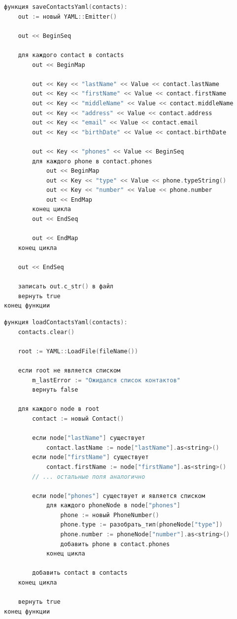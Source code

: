 \begin{lstlisting}[language=C, caption=Функция saveContactsYaml]
функция saveContactsYaml(contacts):
    out := новый YAML::Emitter()
    
    out << BeginSeq
    
    для каждого contact в contacts
        out << BeginMap
        
        out << Key << "lastName" << Value << contact.lastName
        out << Key << "firstName" << Value << contact.firstName
        out << Key << "middleName" << Value << contact.middleName
        out << Key << "address" << Value << contact.address
        out << Key << "email" << Value << contact.email
        out << Key << "birthDate" << Value << contact.birthDate
        
        out << Key << "phones" << Value << BeginSeq
        для каждого phone в contact.phones
            out << BeginMap
            out << Key << "type" << Value << phone.typeString()
            out << Key << "number" << Value << phone.number
            out << EndMap
        конец цикла
        out << EndSeq
        
        out << EndMap
    конец цикла
    
    out << EndSeq
    
    записать out.c_str() в файл
    вернуть true
конец функции
\end{lstlisting}

\begin{lstlisting}[language=C, caption=Функция loadContactsYaml]
функция loadContactsYaml(contacts):
    contacts.clear()
    
    root := YAML::LoadFile(fileName())
    
    если root не является списком
        m_lastError := "Ожидался список контактов"
        вернуть false
    
    для каждого node в root
        contact := новый Contact()
        
        если node["lastName"] существует
            contact.lastName := node["lastName"].as<string>()
        если node["firstName"] существует
            contact.firstName := node["firstName"].as<string>()
        // ... остальные поля аналогично
        
        если node["phones"] существует и является списком
            для каждого phoneNode в node["phones"]
                phone := новый PhoneNumber()
                phone.type := разобрать_тип(phoneNode["type"])
                phone.number := phoneNode["number"].as<string>()
                добавить phone в contact.phones
            конец цикла
        
        добавить contact в contacts
    конец цикла
    
    вернуть true
конец функции
\end{lstlisting}

